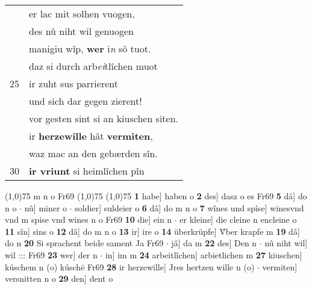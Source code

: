 \documentclass[8pt,a4paper,notitlepage]{article}
\begin{document}
\begin{table}[ht]
\begin{minipage}[t]{0.5\linewidth}
\begin{tabular}{rl}
 & er lac mit solhen vuogen,\\ 
 & des nû niht wil genuogen\\ 
 & manigiu wîp, \textbf{wer} i\textit{n} sô tuot.\\ 
 & daz si durch arb\textit{ei}tlîchen muot\\ 
25 & ir zuht sus parrierent\\ 
 & und sich dar gegen zierent!\\ 
 & vor gesten sint si an kiuschen siten.\\ 
 & ir \textbf{herzewille} hât \textbf{vermiten},\\ 
 & waz mac an den gebærden sîn.\\ 
30 & \textbf{ir vriunt} si heimlîchen pîn\\ 
\end{tabular}
\scriptsize
\line(1,0){75} \newline
m n o Fr69 \newline
\line(1,0){75} \newline
\newline
\line(1,0){75} \newline
\textbf{1} habe] haben o \textbf{2} des] dasz o es Fr69 \textbf{5} dâ] do n o  $\cdot$ nû] miner o  $\cdot$ soldier] suldeier o \textbf{6} dâ] do m n o \textbf{7} wînes und spîse] winesvnd vnd m spise vnd wines n o Fr69 \textbf{10} die] ein n  $\cdot$ er kleine] die cleine n encleine o \textbf{11} sîn] sins o \textbf{12} dâ] do m n o \textbf{13} ir] ire o \textbf{14} überkrüpfe] V̂ber krapfe m \textbf{19} dâ] do n \textbf{20} Si sprachent beide sament Ja Fr69  $\cdot$ jâ] da m \textbf{22} des] Den n  $\cdot$ nû niht wil] wil ::: Fr69 \textbf{23} wer] der n  $\cdot$ in] im m \textbf{24} arbeitlîchen] arbietlichen m \textbf{27} kiuschen] kúschem n (o) kúschē Fr69 \textbf{28} ir herzewille] Jres hertzen wille n (o)  $\cdot$ vermiten] versnitten n o \textbf{29} den] dent o \newline
\end{minipage}
\end{table}
\newpage
\end{document}
